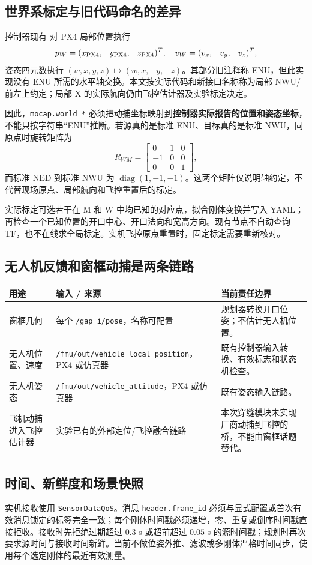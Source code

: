 \documentclass[UTF8,fontset=fandol,a4paper,10pt]{ctexart}
\newcommand{\code}[1]{{\small\nolinkurl{#1}}}
\newcommand{\file}[1]{{\small\path{#1}}}
\begin{document}
\subsection{世界系标定与旧代码命名的差异}
控制器现有 \file{px4ctrl/src/input.cpp} 对 PX4 局部位置执行
\[
 p_W=(x_{\rm PX4},-y_{\rm PX4},-z_{\rm PX4})^T,
\quad v_W=(v_x,-v_y,-v_z)^T,
\]
姿态四元数执行 $(w,x,y,z)\mapsto(w,x,-y,-z)$。其部分旧注释称 ENU，但此实现没有 ENU 所需的水平轴交换。本文按实际代码和新接口名称称为局部 NWU/前左上约定；局部 X 的实际航向仍由飞控估计器及实验标定决定。

因此，\code{mocap.world_*} 必须把动捕坐标映射到\textbf{控制器实际报告的位置和姿态坐标}，不能只按字符串“ENU”推断。若源真的是标准 ENU、目标真的是标准 NWU，同原点时旋转矩阵为
\[
 R_{WM}=\begin{bmatrix}0&1&0\\-1&0&0\\0&0&1\end{bmatrix},
\]
而标准 NED 到标准 NWU 为 $\operatorname{diag}(1,-1,-1)$。这两个矩阵仅说明轴约定，不代替现场原点、局部航向和飞控重置后的标定。

实际标定可选若干在 M 和 W 中均已知的对应点，拟合刚体变换并写入 YAML；再检查一个已知位置的开口中心、开口法向和宽高方向。现有节点不自动查询 TF，也不在线求全局标定。实机飞控原点重置时，固定标定需要重新核对。

\subsection{无人机反馈和窗框动捕是两条链路}
\noindent\begin{tabularx}{\linewidth}{@{}p{28mm}YY@{}}\toprule
用途 & 输入 / 来源 & 当前责任边界\\\midrule
窗框几何 & 每个 \code{/gap_i/pose}，名称可配置 & 规划器转换开口位姿；不估计无人机位置。\\
无人机位置、速度 & \code{/fmu/out/vehicle_local_position}，PX4 或仿真器 & 既有控制器输入转换、有效标志和状态机检查。\\
无人机姿态 & \code{/fmu/out/vehicle_attitude}，PX4 或仿真器 & 既有姿态输入链路。\\
飞机动捕进入飞控估计器 & 实验已有的外部定位/飞控融合链路 & 本次穿缝模块未实现厂商动捕到飞控的桥，不能由窗框话题替代。\\\bottomrule
\end{tabularx}

\subsection{时间、新鲜度和场景快照}
实机接收使用 \code{SensorDataQoS}。消息 \code{header.frame_id} 必须与显式配置或首次有效消息锁定的标签完全一致；每个刚体时间戳必须递增，零、重复或倒序时间戳直接拒收。接收时先拒绝过期超过 $0.3$ s 或超前超过 $0.05$ s 的源时间戳；规划时再次要求源时间与接收时间新鲜。当前不做位姿外推、滤波或多刚体严格时间同步，使用每个选定刚体的最近有效测量。
\end{document}
